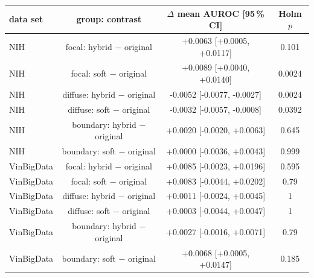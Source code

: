 \begin{tabular}{lccc}
\toprule
data set & group: contrast & $\Delta$ mean AUROC [95\,\% CI] & Holm $p$ \\
\midrule
NIH & focal: hybrid $-$ original & +0.0063 [+0.0005, +0.0117] & 0.101 \\
NIH & focal: soft $-$ original & +0.0089 [+0.0040, +0.0140] & 0.0024 \\
NIH & diffuse: hybrid $-$ original & -0.0052 [-0.0077, -0.0027] & 0.0024 \\
NIH & diffuse: soft $-$ original & -0.0032 [-0.0057, -0.0008] & 0.0392 \\
NIH & boundary: hybrid $-$ original & +0.0020 [-0.0020, +0.0063] & 0.645 \\
NIH & boundary: soft $-$ original & +0.0000 [-0.0036, +0.0043] & 0.999 \\
VinBigData & focal: hybrid $-$ original & +0.0085 [-0.0023, +0.0196] & 0.595 \\
VinBigData & focal: soft $-$ original & +0.0083 [-0.0044, +0.0202] & 0.79 \\
VinBigData & diffuse: hybrid $-$ original & +0.0011 [-0.0024, +0.0045] & 1 \\
VinBigData & diffuse: soft $-$ original & +0.0003 [-0.0044, +0.0047] & 1 \\
VinBigData & boundary: hybrid $-$ original & +0.0027 [-0.0016, +0.0071] & 0.79 \\
VinBigData & boundary: soft $-$ original & +0.0068 [+0.0005, +0.0147] & 0.185 \\
\bottomrule
\end{tabular}
